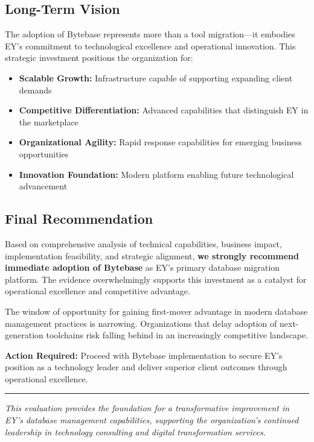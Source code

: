 \subsection{Long-Term Vision}

The adoption of Bytebase represents more than a tool migration—it embodies EY's commitment to technological excellence and operational innovation. This strategic investment positions the organization for:

\begin{itemize}
    \item \textbf{Scalable Growth:} Infrastructure capable of supporting expanding client demands
    \item \textbf{Competitive Differentiation:} Advanced capabilities that distinguish EY in the marketplace
    \item \textbf{Organizational Agility:} Rapid response capabilities for emerging business opportunities
    \item \textbf{Innovation Foundation:} Modern platform enabling future technological advancement
\end{itemize}

\subsection{Final Recommendation}

Based on comprehensive analysis of technical capabilities, business impact, implementation feasibility, and strategic alignment, \textbf{we strongly recommend immediate adoption of Bytebase} as EY's primary database migration platform. The evidence overwhelmingly supports this investment as a catalyst for operational excellence and competitive advantage.

The window of opportunity for gaining first-mover advantage in modern database management practices is narrowing. Organizations that delay adoption of next-generation toolchains risk falling behind in an increasingly competitive landscape.

\textbf{Action Required:} Proceed with Bytebase implementation to secure EY's position as a technology leader and deliver superior client outcomes through operational excellence.

\vspace{1cm}
\hrule
\vspace{0.5cm}
\textit{This evaluation provides the foundation for a transformative improvement in EY's database management capabilities, supporting the organization's continued leadership in technology consulting and digital transformation services.}
